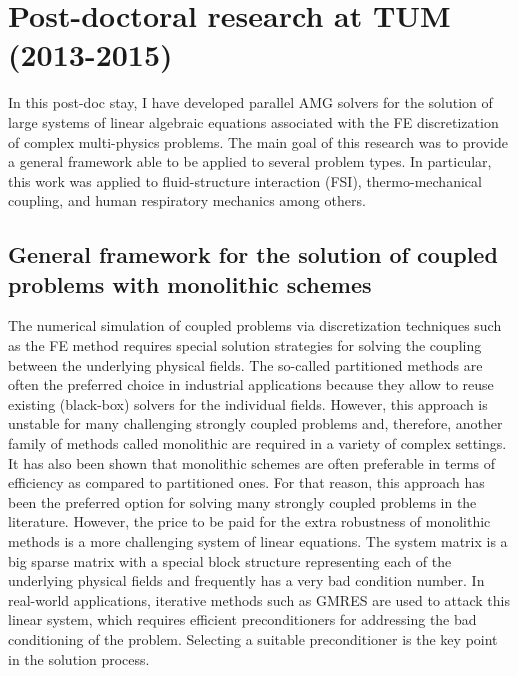 \documentclass{article}
\newcommand{\bemph}[1]{#1}
\begin{document}
\section{Post-doctoral research at TUM (2013-2015)} \label{sec:tum}

In this post-doc stay, \bemph{I have developed parallel AMG solvers for the solution of large systems of linear algebraic equations associated with the FE discretization of complex multi-physics problems}.  The main goal of this research was to provide a general framework able to be applied to several problem types. In particular, this work was applied to fluid-structure interaction (FSI), thermo-mechanical coupling, and human respiratory mechanics among others.

\subsection{General framework for the solution of coupled problems with monolithic schemes}

The numerical simulation of coupled problems via discretization techniques such as the FE method requires special solution strategies for solving the coupling between
the underlying physical fields. The so-called partitioned methods \cite{felippa_2001} are often the preferred choice in industrial applications because they allow to reuse existing (black-box) solvers for the individual fields. However, this approach is unstable for many challenging strongly coupled problems \cite{forster_2007} and, therefore, another family of methods called monolithic are required in a variety of complex settings. It has also been shown that monolithic schemes are often preferable in terms of efficiency as compared to partitioned ones. For that reason, this approach has been the preferred option for solving many strongly coupled problems in the literature. However, the price to be paid for the extra robustness of monolithic methods is a more challenging system of linear equations. The system matrix is a big sparse matrix with a special block structure representing each of the underlying physical fields and frequently has a very bad condition number. In real-world applications, iterative methods such as GMRES are used to attack this linear system, which requires efficient preconditioners for addressing the bad conditioning of the problem. Selecting a suitable preconditioner is the key point in the solution process.
\end{document}
